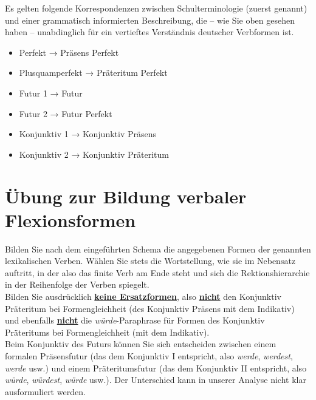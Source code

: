 Es gelten folgende Korrespondenzen zwischen Schulterminologie (zuerst genannt) und einer grammatisch informierten Beschreibung, die -- wie Sie oben gesehen haben -- unabdinglich für ein vertieftes Verständnis deutscher Verbformen ist.

\begin{itemize}\Lf
  \item Perfekt → Präsens Perfekt
  \item Plusquamperfekt → Präteritum Perfekt
  \item Futur 1 → Futur
  \item Futur 2 → Futur Perfekt
  \item Konjunktiv 1 → Konjunktiv Präsens
  \item Konjunktiv 2 → Konjunktiv Präteritum
\end{itemize}

\newpage

\section{Übung zur Bildung verbaler Flexionsformen}

Bilden Sie nach dem eingeführten Schema die angegebenen Formen der genannten lexikalischen Verben.
Wählen Sie stets die Wortstellung, wie sie im Nebensatz auftritt, in der also das finite Verb am Ende steht und sich die Rektionshierarchie in der Reihenfolge der Verben spiegelt.\\

Bilden Sie ausdrücklich \ul{\textbf{keine Ersatzformen}}, also \ul{\textbf{nicht}} den Konjunktiv Präteritum bei Formengleichheit (des Konjunktiv Präsens mit dem Indikativ) und ebenfalls \ul{\textbf{nicht}} die \textit{würde}-Paraphrase für Formen des Konjunktiv Präteritums bei Formengleichheit (mit dem Indikativ).\\

Beim Konjunktiv des Futurs können Sie sich entscheiden zwischen einem formalen Präsensfutur (das dem Konjunktiv I entspricht, also \textit{werde}, \textit{werdest}, \textit{werde} usw.) und einem Präteritumsfutur (das dem Konjunktiv II entspricht, also \textit{würde}, \textit{würdest}, \textit{würde} usw.).
Der Unterschied kann in unserer Analyse nicht klar ausformuliert werden.

\Zeile

